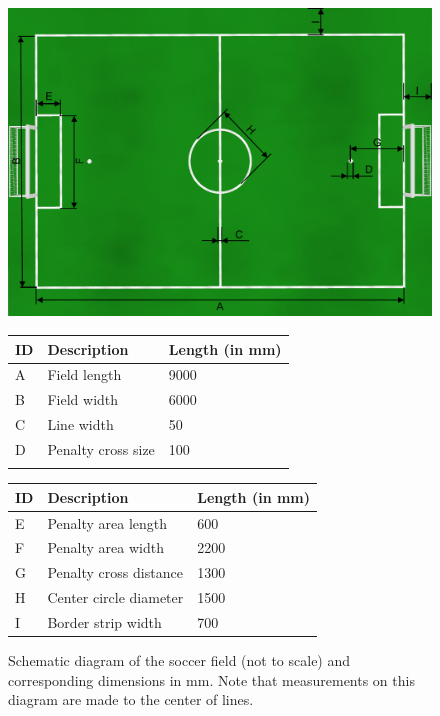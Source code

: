 \documentclass[12pt]{article}
\begin{document}
\begin{figure}[b!]
\centerline{\includegraphics[width=\columnwidth]{figs/fieldDimensions2015.pdf}}
\vspace{1ex}
\begin{tabular}{| l | l | l |}
ID & Description & Length (in mm) \\
\hline
A & Field length & 9000 \\
\hline
B & Field width & 6000 \\
\hline
C & Line width & 50 \\ 
\hline
D & Penalty cross size & 100 \\ 
\hline
 &  &  \\
\end{tabular}
\begin{tabular}{|l|l|l|}
ID & Description & Length (in mm) \\
\hline
E & Penalty area length & 600 \\
\hline
F & Penalty area width & 2200 \\
\hline
G & Penalty cross distance & 1300 \\ 
\hline
H & Center circle diameter & 1500 \\
\hline
I & Border strip width & 700 \\
\end{tabular}
\caption{Schematic diagram of the soccer field (not to scale) and corresponding dimensions in mm.  Note that measurements on this diagram are made to the center of lines.} \label{fig:field_dim}
\end{figure}
\end{document}
